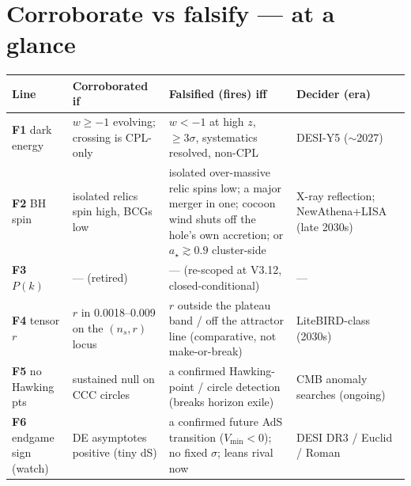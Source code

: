\documentclass[11pt,a4paper]{article}
\begin{document}
\section*{Corroborate vs falsify --- at a glance}
\begin{tabularx}{\textwidth}{@{}>{\raggedright\arraybackslash}p{2.3cm} Y Y >{\raggedright\arraybackslash}p{2.6cm}@{}}
\toprule
\textbf{Line} & \textbf{Corroborated if} & \textbf{Falsified (fires) iff} & \textbf{Decider (era)} \\
\midrule
\textbf{F1} dark energy & $w\geq-1$ evolving; crossing is CPL-only & $w<-1$ at high $z$, $\geq3\sigma$, systematics resolved, non-CPL & DESI-Y5 ($\sim$2027) \\
\textbf{F2} BH spin & isolated relics spin high, BCGs low & isolated over-massive relic spins low; a major merger in one; cocoon wind shuts off the hole's own accretion; or $a_\star\gtrsim0.9$ cluster-side & X-ray reflection; NewAthena+LISA (late 2030s) \\
\textbf{F3} $P(k)$ & --- (retired) & --- (re-scoped at V3.12, closed-conditional) & --- \\
\textbf{F4} tensor $r$ & $r$ in 0.0018--0.009 on the $(n_s,r)$ locus & $r$ outside the plateau band / off the attractor line (comparative, not make-or-break) & LiteBIRD-class (2030s) \\
\textbf{F5} no Hawking pts & sustained null on CCC circles & a confirmed Hawking-point / circle detection (breaks horizon exile) & CMB anomaly searches (ongoing) \\
\textbf{F6} endgame sign (watch) & DE asymptotes positive (tiny dS) & a confirmed future AdS transition ($V_{\min}<0$); no fixed $\sigma$; leans rival now & DESI DR3 / Euclid / Roman \\
\bottomrule
\end{tabularx}

\hrulefill
\end{document}
